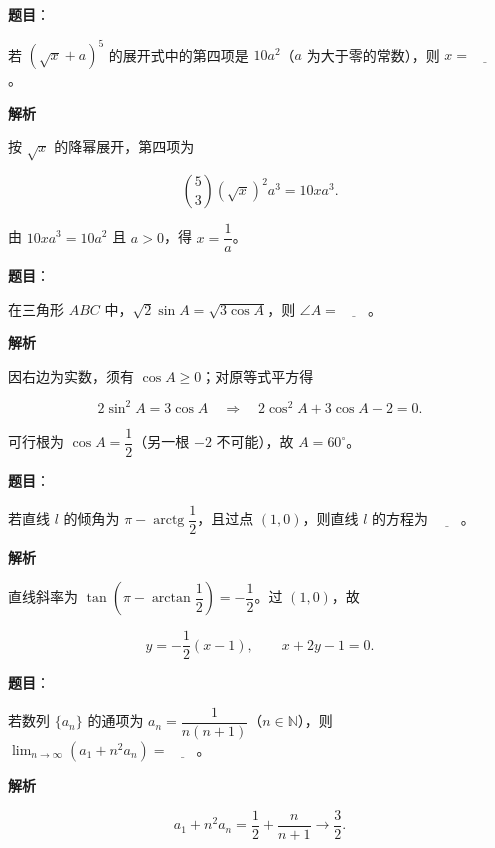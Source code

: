 \begin{answer}

\textbf{题目}：

若 $(\sqrt{x}+a)^5$ 的展开式中的第四项是 $10a^2$（$a$ 为大于零的常数），则 $x=\underline{\qquad}$。

\textbf{解析}

按 $\sqrt{x}$ 的降幂展开，第四项为

\nopagebreak[4]
\[
\binom53(\sqrt{x})^2a^3=10xa^3.
\]

由 $10xa^3=10a^2$ 且 $a>0$，得 $x=\dfrac1a$。


\end{answer}
\begin{answer}

\textbf{题目}：

在三角形 $ABC$ 中，$\sqrt{2}\sin A=\sqrt{3\cos A}$，则 $\angle A=\underline{\qquad}$。

\textbf{解析}

因右边为实数，须有 $\cos A\ge0$；对原等式平方得

\nopagebreak[4]
\[
2\sin^2 A=3\cos A
\quad\Longrightarrow\quad
2\cos^2 A+3\cos A-2=0.
\]

可行根为 $\cos A=\dfrac12$（另一根 $-2$ 不可能），故 $A=60^\circ$。


\end{answer}
\begin{answer}

\textbf{题目}：

若直线 $l$ 的倾角为 $\pi-\operatorname{arctg}\dfrac{1}{2}$，且过点 $(1,0)$，则直线 $l$ 的方程为 $\underline{\qquad}$。

\textbf{解析}

直线斜率为 $\tan\left(\pi-\arctan\dfrac12\right)=-\dfrac12$。过 $(1,0)$，故

\nopagebreak[4]
\[
y=-\frac12(x-1),\qquad x+2y-1=0.
\]


\end{answer}
\begin{answer}

\textbf{题目}：

若数列 $\{a_n\}$ 的通项为 $a_n=\dfrac{1}{n(n+1)}$（$n\in\mathbb{N}$），则 $\displaystyle\lim_{n\to\infty}(a_1+n^2a_n)=\underline{\qquad}$。

\textbf{解析}

\nopagebreak[4]
\[
a_1+n^2a_n=\frac12+\frac{n}{n+1}\longrightarrow\frac32.
\]


\end{answer}
